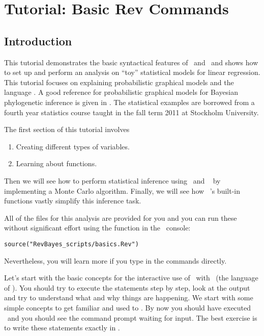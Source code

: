 
%
%
\section{Tutorial: Basic Rev Commands}

\subsection{Introduction}

This tutorial demonstrates the basic syntactical features of \RevBayes~and \Rev~and shows how to set up and perform an analysis on ``toy'' statistical models for linear regression. 
This tutorial focuses on explaining probabilistic graphical models and the language \Rev.
A good reference for probabilistic graphical models for Bayesian phylogenetic inference is given in \cite{Hohna2014b}.
The statistical examples are borrowed from a fourth year statistics course taught in the fall term 2011 at Stockholm University.

The first section of this tutorial involves 
\begin{enumerate}
\item Creating different types of variables.
\item Learning about functions. 
\end{enumerate}

Then we will see how to perform statistical inference using \RevBayes~and \Rev~ by implementing a Monte Carlo algorithm. 
Finally, we will see how \RevBayes~'s built-in functions vastly simplify this inference task.

All of the files for this analysis are provided for you and you can run these without significant effort using the  function in the \RevBayes~console:
{\tt \begin{snugshade*}
\begin{lstlisting}
source("RevBayes_scripts/basics.Rev")
\end{lstlisting}
\end{snugshade*}}
Nevertheless, you will learn more if you type in the commands directly.

Let's start with the basic concepts for the interactive use of \RevBayes~with \Rev~(the language of \RevBayes). 
You should try to execute the statements step by step, look at the output and try to understand what and why things are happening. 
We start with some simple concepts to get familiar and used to \RevBayes. 
By now you should have executed \RevBayes~and you should see the command prompt waiting for input. 
The best exercise is to write these statements exactly in \RevBayes. 

